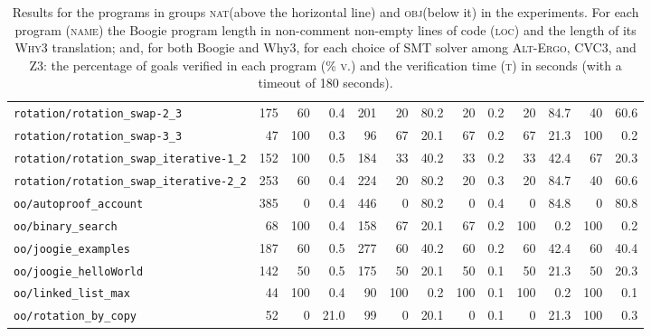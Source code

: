 \documentclass[a4paper,final]{llncs}
\newcommand{\nat}{\textsc{nat}\xspace} \newcommand{\tes}{\textsc{tes}\xspace} \newcommand{\obj}{\textsc{obj}\xspace}
\newcommand{\Boogie}{Boogie\xspace}
\newcommand{\Why}{Why3\xspace}
\begin{document}
\begin{table}
\begin{tabular}{l |r *{1}{rr} |r *{4}{rr}}
\verb|rotation/rotation_swap-2_3|  &  175  &  60  &  0.4  &  201  &  20  &  80.2  &  20  &  0.2  &  20  &  84.7  &  40  &  60.6  \\
\verb|rotation/rotation_swap-3_3|  &  47  &  100  &  0.3  &  96  &  67  &  20.1  &  67  &  0.2  &  67  &  21.3  &  100  &  0.2  \\
\verb|rotation/rotation_swap_iterative-1_2|  &  152  &  100  &  0.5  &  184  &  33  &  40.2  &  33  &  0.2  &  33  &  42.4  &  67  &  20.3  \\
\verb|rotation/rotation_swap_iterative-2_2|  &  253  &  60  &  0.4  &  224  &  20  &  80.2  &  20  &  0.3  &  20  &  84.7  &  40  &  60.6
 \\
 \hline
\verb|oo/autoproof_account|  &  385  &  0  &  0.4  &  446  &  0  &  80.2  &  0  &  0.4  &  0  &  84.8  &  0  &  80.8  \\
\verb|oo/binary_search|  &  68  &  100  &  0.4  &  158  &  67  &  20.1  &  67  &  0.2  &  100  &  0.2  &  100  &  0.2  \\
\verb|oo/joogie_examples|  &  187  &  60  &  0.5  &  277  &  60  &  40.2  &  60  &  0.2  &  60  &  42.4  &  60  &  40.4  \\
\verb|oo/joogie_helloWorld|  &  142  &  50  &  0.5  &  175  &  50  &  20.1  &  50  &  0.1  &  50  &  21.3  &  50  &  20.3  \\
\verb|oo/linked_list_max|  &  44  &  100  &  0.4  &  90  &  100  &  0.2  &  100  &  0.1  &  100  &  0.2  &  100  &  0.1  \\
\verb|oo/rotation_by_copy|  &  52  &  0  &  21.0  &  99  &  0  &  20.1  &  0  &  0.1  &  0  &  21.3  &  100  &  0.3
 \\
 \end{tabular}
\caption{Results for the programs in groups \nat (above the horizontal line) and \obj (below it) in the experiments. 
For each program (\textsc{name}) the \Boogie program length in non-comment non-empty lines of code (\textsc{loc}) and the length of its \textsc{\Why} translation; and, for both \Boogie and \Why, for each choice of SMT solver among \textsc{Alt-Ergo}, \textsc{CVC3}, and \textsc{Z3}: the percentage of goals verified in each program (\textsc{\% v.}) and the verification time (\textsc{t}) in seconds (with a timeout of 180 seconds).}
\label{tab:programs-full-boogie-oo}
\end{table}

\clearpage
\end{document}

